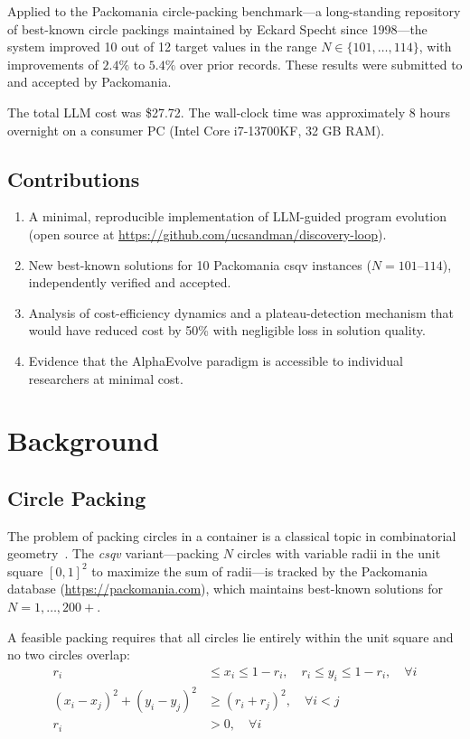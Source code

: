 \documentclass[11pt]{article}
\begin{document}
Applied to the Packomania circle-packing benchmark---a long-standing repository of best-known
circle packings maintained by Eckard Specht since 1998---the system improved 10 out of 12
target values in the range $N \in \{101, \ldots, 114\}$, with improvements of $2.4\%$ to
$5.4\%$ over prior records. These results were submitted to and accepted by Packomania.

The total LLM cost was \$27.72. The wall-clock time was approximately 8 hours overnight on a
consumer PC (Intel Core i7-13700KF, 32 GB RAM).

\subsection{Contributions}

\begin{enumerate}
  \item A minimal, reproducible implementation of LLM-guided program evolution (open source
        at \url{https://github.com/ucsandman/discovery-loop}).
  \item New best-known solutions for 10 Packomania csqv instances ($N = 101$--$114$),
        independently verified and accepted.
  \item Analysis of cost-efficiency dynamics and a plateau-detection mechanism that would
        have reduced cost by 50\% with negligible loss in solution quality.
  \item Evidence that the AlphaEvolve paradigm is accessible to individual researchers at
        minimal cost.
\end{enumerate}

\section{Background}

\subsection{Circle Packing}

The problem of packing circles in a container is a classical topic in combinatorial
geometry~\citep{hifi2009}. The \emph{csqv} variant---packing $N$ circles with variable radii
in the unit square $[0,1]^2$ to maximize the sum of radii---is tracked by the Packomania
database (\url{https://packomania.com}), which maintains best-known solutions for
$N = 1, \ldots, 200+$.

A feasible packing requires that all circles lie entirely within the unit square and no two
circles overlap:
\begin{align}
  r_i &\leq x_i \leq 1 - r_i, \quad r_i \leq y_i \leq 1 - r_i, \quad \forall i \\
  (x_i - x_j)^2 + (y_i - y_j)^2 &\geq (r_i + r_j)^2, \quad \forall i < j \\
  r_i &> 0, \quad \forall i
\end{align}
\end{document}
